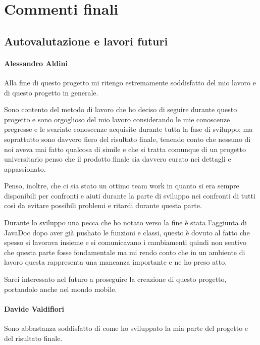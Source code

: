 \documentclass[a4paper,12pt]{report}
\begin{document}
\chapter{Commenti finali}

\section{Autovalutazione e lavori futuri}

\subsubsection{Alessandro Aldini}

Alla fine di questo progetto mi ritengo estremamente soddisfatto del mio lavoro e di questo progetto in generale. 

Sono contento del metodo di lavoro che ho deciso di seguire durante questo progetto e sono orgoglioso del mio lavoro considerando le mie conoscenze pregresse e le svariate conoscenze acquisite durante tutta la fase di sviluppo; ma soprattutto sono davvero fiero del risultato finale, tenendo conto che nessuno di noi aveva mai fatto qualcosa di simile e che si tratta comunque di un progetto universitario penso che il prodotto finale sia davvero curato nei dettagli e appassionato. 

Penso, inoltre, che ci sia stato un ottimo team work in quanto si era sempre disponibili per confronti e aiuti durante la parte di sviluppo nei confronti di tutti così da evitare possibili problemi e ritardi durante questa parte. 

Durante lo sviluppo una pecca che ho notato verso la fine è stata l’aggiunta di JavaDoc dopo aver già pushato le funzioni e classi, questo è dovuto al fatto che spesso si lavorava insieme e si comunicavano i cambiamenti quindi non sentivo che questa parte fosse fondamentale ma mi rendo conto che in un ambiente di lavoro questa rappresenta una mancanza importante e ne ho preso atto.

Sarei interessato nel futuro a proseguire la creazione di questo progetto, portandolo anche nel mondo mobile.

\subsubsection{Davide Valdifiori}

Sono abbastanza soddisfatto di come ho sviluppato la mia parte del progetto e del risultato finale.
\end{document}
